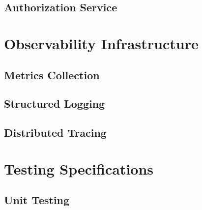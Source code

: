 \documentclass[12pt,a4paper,twoside]{report}
\begin{document}

\section{Authorization Service}



\chapter{Observability Infrastructure}

\section{Metrics Collection}


\section{Structured Logging}


\section{Distributed Tracing}



\chapter{Testing Specifications}

\section{Unit Testing}
\end{document}
